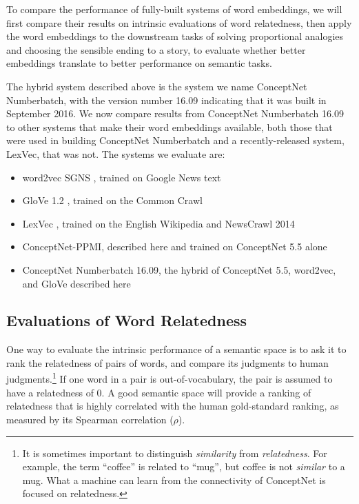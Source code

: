 \documentclass[letterpaper]{article}
\begin{document}
To compare the performance of fully-built systems of word embeddings, we will
first compare their results on intrinsic evaluations of word relatedness, then
apply the word embeddings to the downstream tasks of solving proportional
analogies and choosing the sensible ending to a story, to evaluate whether
better embeddings translate to better performance on semantic tasks.

The hybrid system described above is the system we name ConceptNet Numberbatch,
with the version number 16.09 indicating that it was built in September 2016.
We now compare results from ConceptNet Numberbatch 16.09 to other systems that
make their word embeddings available, both those that were used in building
ConceptNet Numberbatch and a recently-released system, LexVec, that was not.
The systems we evaluate are:

\begin{itemize}
    \item word2vec SGNS \cite{mikolov2013word2vec}, trained on Google News text
    \item GloVe 1.2 \cite{pennington2014glove}, trained on the Common Crawl
    \item LexVec \cite{salle2016lexvec}, trained on the English Wikipedia and NewsCrawl 2014
    \item ConceptNet-PPMI, described here and trained on ConceptNet 5.5 alone
    \item ConceptNet Numberbatch 16.09, the hybrid of ConceptNet 5.5, word2vec, and GloVe described here
\end{itemize}

\subsection{Evaluations of Word Relatedness}
\label{intrinsic-evaluations}

One way to evaluate the intrinsic performance of a semantic space is to ask it
to rank the relatedness of pairs of words, and compare its judgments to human
judgments.\footnote{It is sometimes important to distinguish \emph{similarity}
from \emph{relatedness}. For example, the term ``coffee'' is related to
``mug'', but coffee is not \emph{similar} to a mug. What a machine can learn
from the connectivity of ConceptNet is focused on relatedness.} If one word in
a pair is out-of-vocabulary, the pair is assumed to have a relatedness of 0. A
good semantic space will provide a ranking of relatedness that is highly
correlated with the human gold-standard ranking, as measured by its Spearman
correlation ($\rho$).
\end{document}
